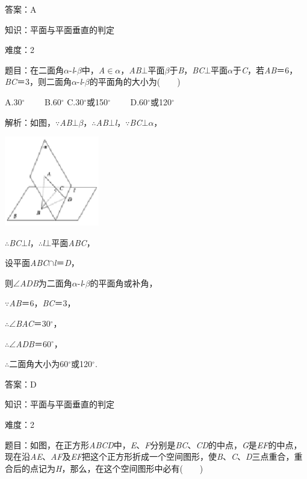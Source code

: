 \documentclass{article} %
\begin{document}
答案：A



知识：平面与平面垂直的判定

难度：2

题目：在二面角\textit{$\alpha$}-\textit{l}-\textit{$\beta$}中，\textit{A}$\mathrm{\in}$\textit{$\alpha$}，\textit{AB}$\mathrm{\bot}$平面\textit{$\beta$}于\textit{B}，\textit{BC}$\mathrm{\bot}$平面\textit{$\alpha$}于\textit{C}，若\textit{AB}＝6，\textit{BC}＝3，则二面角\textit{$\alpha$}-\textit{l}-\textit{$\beta$}的平面角的大小为(　　)

A.30$\mathrm{{}^\circ}$　　 B.60$\mathrm{{}^\circ}$ C.30$\mathrm{{}^\circ}$或150$\mathrm{{}^\circ}$　　 D.60$\mathrm{{}^\circ}$或120$\mathrm{{}^\circ}$

解析：如图，$\mathrm{\because}$\textit{AB}$\mathrm{\bot}$\textit{$\beta$}，$\mathrm{\therefore}$\textit{AB}$\mathrm{\bot}$\textit{l}，$\mathrm{\because}$\textit{BC}$\mathrm{\bot}$\textit{$\alpha$}，

\includegraphics*[width=1.62in, height=1.54in, keepaspectratio=false]{image221}

$\mathrm{\therefore}$\textit{BC}$\mathrm{\bot}$\textit{l}，$\mathrm{\therefore}$\textit{l}$\mathrm{\bot}$平面\textit{ABC}，

设平面\textit{ABC}$\mathrm{\cap}$\textit{l}＝\textit{D}，

则$\mathrm{\angle}$\textit{ADB}为二面角\textit{$\alpha$}-\textit{l}-\textit{$\beta$}的平面角或补角，

$\mathrm{\because}$\textit{AB}＝6，\textit{BC}＝3，

$\mathrm{\therefore}$$\mathrm{\angle}$\textit{BAC}＝30$\mathrm{{}^\circ}$，

$\mathrm{\therefore}$$\mathrm{\angle}$\textit{ADB}＝60$\mathrm{{}^\circ}$，

$\mathrm{\therefore}$二面角大小为60$\mathrm{{}^\circ}$或120$\mathrm{{}^\circ}$.

答案：D

知识：平面与平面垂直的判定

难度：2

题目：如图，在正方形\textit{ABCD}中，\textit{E}、\textit{F}分别是\textit{BC}、\textit{CD}的中点，\textit{G}是\textit{EF}的中点，现在沿\textit{AE}、\textit{AF}及\textit{EF}把这个正方形折成一个空间图形，使\textit{B}、\textit{C}、\textit{D}三点重合，重合后的点记为\textit{H}，那么，在这个空间图形中必有(　　)
\end{document}
